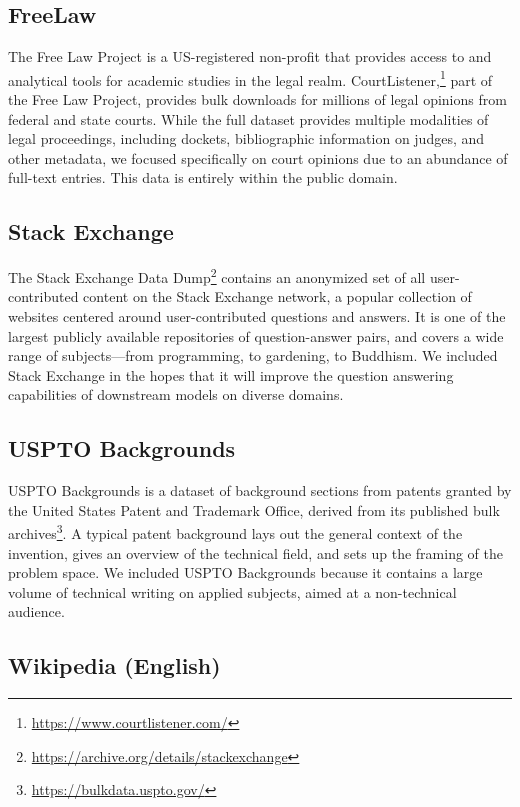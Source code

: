 \documentclass[11pt,a4paper]{article}
\begin{document}
\subsection{FreeLaw}

The Free Law Project is a US-registered non-profit that provides access to and analytical tools for academic studies in the legal realm. CourtListener,\footnote{\url{https://www.courtlistener.com/}} part of the Free Law Project, provides bulk downloads for millions of legal opinions from federal and state courts. While the full dataset provides multiple modalities of legal proceedings, including dockets, bibliographic information on judges, and other metadata, we focused specifically on court opinions due to an abundance of full-text entries. This data is entirely within the public domain.

\subsection{Stack Exchange}

The Stack Exchange Data Dump\footnote{\url{https://archive.org/details/stackexchange}} contains an anonymized set of all user-contributed content on the Stack Exchange network, a popular collection of websites centered around user-contributed questions and answers. It is one of the largest publicly available repositories of question-answer pairs, and covers a wide range of subjects---from programming, to gardening, to Buddhism. We included Stack Exchange in the hopes that it will improve the question answering capabilities of downstream models on diverse domains.

\subsection{USPTO Backgrounds}

USPTO Backgrounds is a dataset of background sections from patents granted by the United States Patent and Trademark Office, derived from its published bulk archives\footnote{\url{https://bulkdata.uspto.gov/}}. A typical patent background lays out the general context of the invention, gives an overview of the technical field, and sets up the framing of the problem space. We included USPTO Backgrounds because it contains a large volume of technical writing on applied subjects, aimed at a non-technical audience.

\subsection{Wikipedia (English)}
\end{document}
